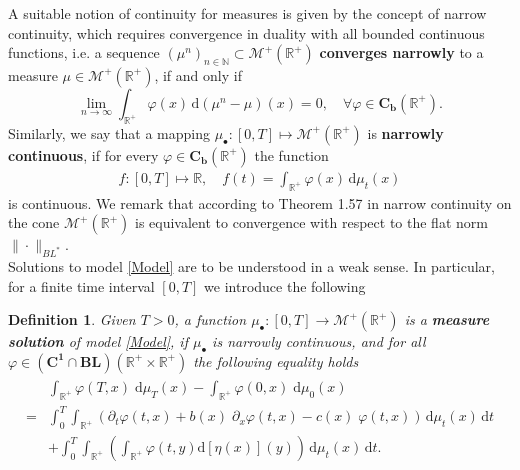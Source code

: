 \documentclass[12pt,a4paper]{amsart}
\newcommand{\ud}{\mathrm{d}}
\newtheorem{definition}[theorem]{Definition}
\newcommand{\Cu}[1]{\mathbf{C^{#1}}}
\newcommand{\Cl}[1]{\mathbf{C_{#1}}}			%
\newcommand{\BL}{\mathbf{BL}}
\newcommand{\reali}{\mathbb{R}}
\newcommand{\naturali}{\mathbb{N}}			%
\renewcommand{\d}[1]{\mathrm{d}{#1}}
\renewcommand{\phi}{\varphi}
\newcommand{\R}{\mathbb{R}}
\begin{document}
\noindent A suitable notion of continuity for measures is given by the concept of narrow continuity, which requires convergence in duality with all bounded continuous functions, i.e. a sequence $(\mu^n)_{n\in\naturali} \subset \mathcal M^+(\reali^+)$ \textbf{converges narrowly} to a measure $\mu \in \mathcal M^+(\reali^+)$, if and only if 
\begin{equation*}
\lim_{n \to \infty} \int_{\reali^+} \phi(x) \,\ud\left(\mu^n - \mu\right) (x) = 0, \quad \forall\phi \in \Cl{b}(\reali^+).
\end{equation*}
Similarly, we say that a mapping $\mu_{\bullet} : [0,T] \mapsto {\mathcal M}^+(\reali^+)$ is \textbf{narrowly continuous}, if for every $\phi \in \Cl{b}(\reali^+)$ the function
    \begin{align*}
    f:[0,T]\mapsto \reali,\quad f(t) = \int_{\reali^+} \phi(x) \,\ud \mu_t(x)
    \end{align*}
is continuous. We remark that according to Theorem 1.57 in \cite{Duell_book} narrow continuity on the cone $\mathcal{M}^+(\R^+)$ is equivalent to convergence with respect to the flat norm $\|\cdot\|_{BL^*}$.\\
\noindent Solutions to model \eqref{Model} are to be understood in a weak sense. In particular, for a finite time interval $[0,T]$ we introduce the following 
\begin{definition}
 \label{def:WeakSolution}
Given $T>0$, a function $\mu_{\bullet} \colon [0,T] \to \mathcal{M}^+(\R^+)$ is a \textbf{measure solution}
of model \eqref{Model}, if $\mu_{\bullet}$ is narrowly continuous, and for all $\phi \in (\Cu{1}
 \cap \BL) \left(\reali^+\times \reali^+\right)$ the following equality holds 
 \begin{align}
 \begin{split}
 \label{Formulation:WeakSolution}
  & \int_{\reali^+} \phi(T,x) \; \d{\mu_T}(x) - \int_{\reali^+}
  \phi(0,x) \; \d{\mu_0}(x)\\
  =&\int_0^T \int_{\reali^+} \left(
   \partial_t \phi(t,x) + b(x) \; \partial_x
   \phi(t,x) - c(x) \; \phi(t,x) \right)\,\ud\mu_t(x)\,\ud{t}   \\
  &+ \int_0^T \int_{\reali^+} \left( \int_{\reali^+} \phi(t,y)
   \d{\left[\eta(x)\right]} (y) \right)\, \ud\mu_t(x)\,\ud{t}.
   \end{split}
\end{align}
\end{definition}
\noindent
 
\end{document}
